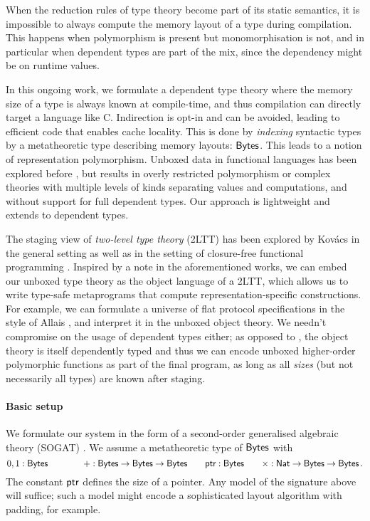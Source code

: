 When the reduction rules of type theory become part of its static semantics, it
is impossible to always compute the memory layout of a type during compilation.
This happens when polymorphism is present but monomorphisation is not, and in
particular when dependent types are part of the mix, since the dependency might
be on runtime values.

In this ongoing work, we formulate a dependent type theory where the memory size
of a type is always known at compile-time, and thus compilation can directly target a
language like C. Indirection is opt-in and can be avoided, leading to efficient
code that enables cache locality. This is done by \emph{indexing} syntactic
types by a metatheoretic type describing memory layouts: $\textsf{Bytes}$. This leads to
a notion of representation polymorphism. Unboxed data in functional languages
has been explored before \cite{Jones1991-ik,Downen2024-nk}, but results in
overly restricted polymorphism or complex theories with multiple levels of kinds
separating values and computations, and without support for full dependent
types. Our approach is lightweight and extends to dependent types.

The staging view of \emph{two-level type theory} (2LTT) \cite{Annenkov2023-vk}
has been explored by Kov\'acs in the general setting \cite{Kovacs2022-rf} as
well as in the setting of closure-free functional programming
\cite{Kovacs2024-hn}. Inspired by a note in the aforementioned works, we can embed
our unboxed type theory as the object language of a 2LTT, which allows us to
write type-safe metaprograms that compute representation-specific constructions.
For example, we can formulate a universe of flat protocol specifications in the
style of Allais \cite{Allais2023-zq}, and interpret it in the unboxed object
theory.
We needn't compromise on the usage of dependent types either; as opposed to
\cite{Kovacs2024-hn}, the object theory is itself dependently typed and thus we
can encode unboxed higher-order polymorphic functions as part of the final
program, as long as all \emph{sizes} (but not necessarily all types) are known after staging.

\paragraph{Basic setup}
We formulate our system in the form of a second-order generalised
algebraic theory (SOGAT) \cite{Kaposi2024-db}.
We assume a metatheoretic type of
\(\textsf{Bytes}\) with
\[
	0, 1 : \textsf{Bytes} \qquad \qquad + : \textsf{Bytes} \to \textsf{Bytes} \to \textsf{Bytes} \qquad \textsf{ptr} : \textsf{Bytes} \qquad \times : \textsf{Nat} \to \textsf{Bytes} \to \textsf{Bytes} \,.
\]
The constant \(\textsf{ptr}\) defines the size of a pointer. Any model of
the signature above will suffice; such a model might encode a sophisticated
layout algorithm with padding, for example.

